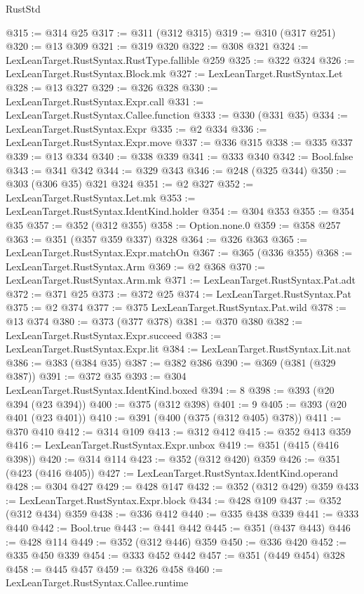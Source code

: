 \begin{lexlean}{RustStd}
\begin{coremodule}
@315 := @314 @25
@317 := @311 (@312 @315)
@319 := @310 (@317 @251)
@320 := @13 @309
@321 := @319 @320
@322 := @308 @321
@324 := LexLeanTarget.RustSyntax.RustType.fallible @259
@325 := @322 @324
@326 := LexLeanTarget.RustSyntax.Block.mk
@327 := LexLeanTarget.RustSyntax.Let
@328 := @13 @327
@329 := @326 @328
@330 := LexLeanTarget.RustSyntax.Expr.call
@331 := LexLeanTarget.RustSyntax.Callee.function
@333 := @330 (@331 @35)
@334 := LexLeanTarget.RustSyntax.Expr
@335 := @2 @334
@336 := LexLeanTarget.RustSyntax.Expr.move
@337 := @336 @315
@338 := @335 @337
@339 := @13 @334
@340 := @338 @339
@341 := @333 @340
@342 := Bool.false
@343 := @341 @342
@344 := @329 @343
@346 := @248 (@325 @344)
@350 := @303 (@306 @35) @321 @324
@351 := @2 @327
@352 := LexLeanTarget.RustSyntax.Let.mk
@353 := LexLeanTarget.RustSyntax.IdentKind.holder
@354 := @304 @353
@355 := @354 @35
@357 := @352 (@312 @355)
@358 := Option.none.{0}
@359 := @358 @257
@363 := @351 (@357 @359 @337) @328
@364 := @326 @363
@365 := LexLeanTarget.RustSyntax.Expr.matchOn
@367 := @365 (@336 @355)
@368 := LexLeanTarget.RustSyntax.Arm
@369 := @2 @368
@370 := LexLeanTarget.RustSyntax.Arm.mk
@371 := LexLeanTarget.RustSyntax.Pat.adt
@372 := @371 @25
@373 := @372 @25
@374 := LexLeanTarget.RustSyntax.Pat
@375 := @2 @374
@377 := @375 LexLeanTarget.RustSyntax.Pat.wild
@378 := @13 @374
@380 := @373 (@377 @378)
@381 := @370 @380
@382 := LexLeanTarget.RustSyntax.Expr.succeed
@383 := LexLeanTarget.RustSyntax.Expr.lit
@384 := LexLeanTarget.RustSyntax.Lit.nat
@386 := @383 (@384 @35)
@387 := @382 @386
@390 := @369 (@381 (@329 @387))
@391 := @372 @35
@393 := @304 LexLeanTarget.RustSyntax.IdentKind.boxed
@394 := 8
@398 := @393 (@20 @394 (@23 @394))
@400 := @375 (@312 @398)
@401 := 9
@405 := @393 (@20 @401 (@23 @401))
@410 := @391 (@400 (@375 (@312 @405) @378))
@411 := @370 @410
@412 := @314 @109
@413 := @312 @412
@415 := @352 @413 @359
@416 := LexLeanTarget.RustSyntax.Expr.unbox
@419 := @351 (@415 (@416 @398))
@420 := @314 @114
@423 := @352 (@312 @420) @359
@426 := @351 (@423 (@416 @405))
@427 := LexLeanTarget.RustSyntax.IdentKind.operand
@428 := @304 @427
@429 := @428 @147
@432 := @352 (@312 @429) @359
@433 := LexLeanTarget.RustSyntax.Expr.block
@434 := @428 @109
@437 := @352 (@312 @434) @359
@438 := @336 @412
@440 := @335 @438 @339
@441 := @333 @440
@442 := Bool.true
@443 := @441 @442
@445 := @351 (@437 @443)
@446 := @428 @114
@449 := @352 (@312 @446) @359
@450 := @336 @420
@452 := @335 @450 @339
@454 := @333 @452 @442
@457 := @351 (@449 @454) @328
@458 := @445 @457
@459 := @326 @458
@460 := LexLeanTarget.RustSyntax.Callee.runtime

\end{coremodule}
\end{lexlean}
